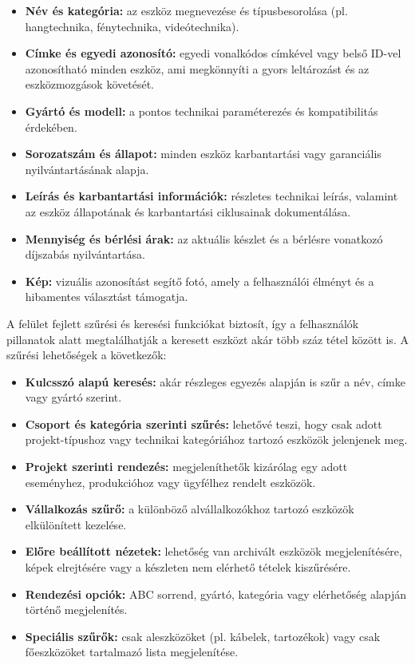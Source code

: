 \begin{itemize}
    \item \textbf{Név és kategória:} az eszköz megnevezése és típusbesorolása (pl. hangtechnika, fénytechnika, videótechnika).  
    \item \textbf{Címke és egyedi azonosító:} egyedi vonalkódos címkével vagy belső ID-vel azonosítható minden eszköz, ami megkönnyíti a gyors leltározást és az eszközmozgások követését.
    \item \textbf{Gyártó és modell:} a pontos technikai paraméterezés és kompatibilitás érdekében.
    \item \textbf{Sorozatszám és állapot:} minden eszköz karbantartási vagy garanciális nyilvántartásának alapja.
    \item \textbf{Leírás és karbantartási információk:} részletes technikai leírás, valamint az eszköz állapotának és karbantartási ciklusainak dokumentálása.
    \item \textbf{Mennyiség és bérlési árak:} az aktuális készlet és a bérlésre vonatkozó díjszabás nyilvántartása.
    \item \textbf{Kép:} vizuális azonosítást segítő fotó, amely a felhasználói élményt és a hibamentes választást támogatja.
\end{itemize}

A felület fejlett szűrési és keresési funkciókat biztosít, így a felhasználók pillanatok alatt megtalálhatják a keresett eszközt akár több száz tétel között is.  
A szűrési lehetőségek a következők:

\begin{itemize}
    \item \textbf{Kulcsszó alapú keresés:} akár részleges egyezés alapján is szűr a név, címke vagy gyártó szerint.
    \item \textbf{Csoport és kategória szerinti szűrés:} lehetővé teszi, hogy csak adott projekt-típushoz vagy technikai kategóriához tartozó eszközök jelenjenek meg.
    \item \textbf{Projekt szerinti rendezés:} megjeleníthetők kizárólag egy adott eseményhez, produkcióhoz vagy ügyfélhez rendelt eszközök.
    \item \textbf{Vállalkozás szűrő:} a különböző alvállalkozókhoz tartozó eszközök elkülönített kezelése.
    \item \textbf{Előre beállított nézetek:} lehetőség van archivált eszközök megjelenítésére, képek elrejtésére vagy a készleten nem elérhető tételek kiszűrésére.
    \item \textbf{Rendezési opciók:} ABC sorrend, gyártó, kategória vagy elérhetőség alapján történő megjelenítés.
    \item \textbf{Speciális szűrők:} csak aleszközöket (pl. kábelek, tartozékok) vagy csak főeszközöket tartalmazó lista megjelenítése.
\end{itemize}

